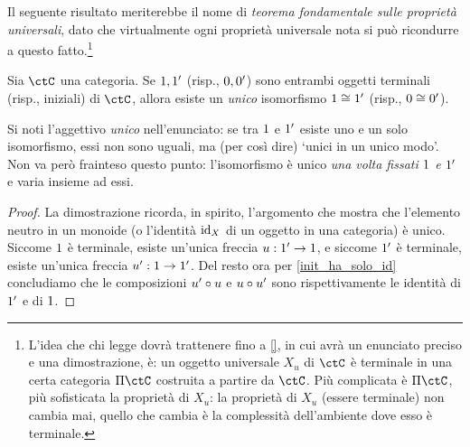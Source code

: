 



Il seguente risultato meriterebbe il nome di \emph{teorema fondamentale sulle proprietà universali}, dato che virtualmente ogni proprietà universale nota si può ricondurre a questo fatto.\footnote{L'idea che chi legge dovrà trattenere fino a \ref{}, in cui avrà un enunciato preciso e una dimostrazione, è: un oggetto universale \(X_u\) di \(\ctC\) è terminale in una certa categoria \(\Pi\ctC\) costruita a partire da \(\ctC\). Più complicata è \(\Pi\ctC\), più sofisticata la proprietà di \(X_u\): la proprietà di \(X_u\) (essere terminale) non cambia mai, quello che cambia è la complessità dell'ambiente dove esso è terminale.}
\begin{proposition}
	Sia \(\ctC\) una categoria. Se \(1,1'\) (risp., \(0,0'\)) sono entrambi oggetti terminali (risp., iniziali) di \(\ctC\), allora esiste un \emph{unico} isomorfismo \(1\cong1'\) (risp., \(0\cong 0'\)).
\end{proposition}
Si noti l'aggettivo \emph{unico} nell'enunciato: se tra \(1\) e \(1'\) esiste uno e un solo isomorfismo, essi non sono uguali, ma (per così dire) `unici in un unico modo'. Non va però frainteso questo punto: l'isomorfismo è unico \emph{una volta fissati \(1\) e \(1'\)} e varia insieme ad essi.
\begin{proof}
	La dimostrazione ricorda, in spirito, l'argomento che mostra che l'elemento neutro in un monoide (o l'identità \(\mathrm{id}_X\) di un oggetto in una categoria) è unico. Siccome \(1\) è terminale, esiste un'unica freccia \(u : 1'\to 1\), e siccome \(1'\) è terminale, esiste un'unica freccia \(u' : 1\to1'\). Del resto ora per \ref{init_ha_solo_id} concludiamo che le composizioni \(u'\circ u\) e \(u\circ u'\) sono rispettivamente le identità di \(1'\) e di \(1\).
\end{proof}
